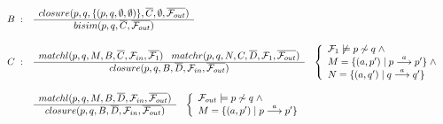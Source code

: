 \begin{figure}
\begingroup\tiny%
\[
\begin{array}{r@{\;\;}c@{\;\;\;\;}l}
B & : &
\myfrac{closure(p,q,\{(p,q,\emptyset,\emptyset)\},\overline{C},\emptyset,\overline{{\cal F}_{out}})}{bisim(p,q,\overline{C},\overline{{\cal F}_{out}})}\\
\\[.5\baselineskip]

C & : &
\myfrac{matchl(p,q,M,B,\overline{C},{\cal F}_{in},\overline{{\cal F}_{1}})\;\;\;matchr(p,q,N,C,\overline{D},{\cal F}_{1},\overline{{\cal F}_{out}})}{closure(p,q,B,\overline{D},{\cal F}_{in},\overline{{\cal F}_{out}})}
\;\;\;\left\{
\begin{array}{l}
{\cal F}_1\not\models p\not\sim q\;\wedge\\
M=\{(a,p')\mid p\der{a}p'\}\;\wedge\\
N=\{(a,q')\mid q\der{a}q'\}
\end{array}
\right.\\
\\[.5\baselineskip]
& &
\myfrac{matchl(p,q,M,B,\overline{D},{\cal F}_{in},\overline{{\cal F}_{out}})}{closure(p,q,B,\overline{D},{\cal F}_{in},\overline{{\cal F}_{out}})}
\;\;\;\left\{
\begin{array}{l}
{\cal F}_{out}\models p\not\sim q\;\wedge\\
M=\{(a,p')\mid p\der{a}p'\}
\end{array}
\right.\\
\\[.5\baselineskip]


\end{array}\]
\end{figure}
